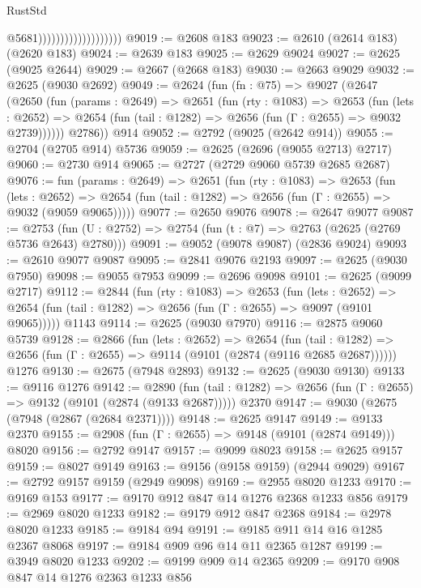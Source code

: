 \begin{lexlean}{RustStd}
\begin{coremodule}
                                          @5681)))))))))))))))))))
@9019 := @2608 @183
@9023 := @2610 (@2614 @183) (@2620 @183)
@9024 := @2639 @183
@9025 := @2629 @9024
@9027 := @2625 (@9025 @2644)
@9029 := @2667 (@2668 @183)
@9030 := @2663 @9029
@9032 := @2625 (@9030 @2692)
@9049 := @2624
    (fun (fn : @75) =>
    @9027
      (@2647
        (@2650
          (fun (params : @2649) =>
          @2651
            (fun (rty : @1083) =>
            @2653
              (fun (lets : @2652) =>
              @2654 (fun (tail : @1282) => @2656 (fun (Γ : @2655) => @9032 @2739))))))
        @2786))
    @914
@9052 := @2792 (@9025 (@2642 @914))
@9055 := @2704 (@2705 @914) @5736
@9059 := @2625 (@2696 (@9055 @2713) @2717)
@9060 := @2730 @914
@9065 := @2727 (@2729 @9060 @5739 @2685 @2687)
@9076 := fun (params : @2649) =>
  @2651
    (fun (rty : @1083) =>
    @2653
      (fun (lets : @2652) =>
      @2654 (fun (tail : @1282) => @2656 (fun (Γ : @2655) => @9032 (@9059 @9065)))))
@9077 := @2650 @9076
@9078 := @2647 @9077
@9087 := @2753 (fun (U : @2752) => @2754 (fun (t : @7) => @2763 (@2625 (@2769 @5736 @2643) @2780)))
@9091 := @9052 (@9078 @9087) (@2836 @9024)
@9093 := @2610 @9077 @9087
@9095 := @2841 @9076 @2193
@9097 := @2625 (@9030 @7950)
@9098 := @9055 @7953
@9099 := @2696 @9098
@9101 := @2625 (@9099 @2717)
@9112 := @2844
    (fun (rty : @1083) =>
    @2653
      (fun (lets : @2652) =>
      @2654 (fun (tail : @1282) => @2656 (fun (Γ : @2655) => @9097 (@9101 @9065)))))
    @1143
@9114 := @2625 (@9030 @7970)
@9116 := @2875 @9060 @5739
@9128 := @2866
    (fun (lets : @2652) =>
    @2654
      (fun (tail : @1282) => @2656 (fun (Γ : @2655) => @9114 (@9101 (@2874 (@9116 @2685 @2687))))))
    @1276
@9130 := @2675 (@7948 @2893)
@9132 := @2625 (@9030 @9130)
@9133 := @9116 @1276
@9142 := @2890
    (fun (tail : @1282) => @2656 (fun (Γ : @2655) => @9132 (@9101 (@2874 (@9133 @2687)))))
    @2370
@9147 := @9030 (@2675 (@7948 (@2867 (@2684 @2371))))
@9148 := @2625 @9147
@9149 := @9133 @2370
@9155 := @2908 (fun (Γ : @2655) => @9148 (@9101 (@2874 @9149))) @8020
@9156 := @2792 @9147
@9157 := @9099 @8023
@9158 := @2625 @9157
@9159 := @8027 @9149
@9163 := @9156 (@9158 @9159) (@2944 @9029)
@9167 := @2792 @9157 @9159 (@2949 @9098)
@9169 := @2955 @8020 @1233
@9170 := @9169 @153
@9177 := @9170 @912 @847 @14 @1276 @2368 @1233 @856
@9179 := @2969 @8020 @1233
@9182 := @9179 @912 @847 @2368
@9184 := @2978 @8020 @1233
@9185 := @9184 @94
@9191 := @9185 @911 @14 @16 @1285 @2367 @8068
@9197 := @9184 @909 @96 @14 @11 @2365 @1287
@9199 := @3949 @8020 @1233
@9202 := @9199 @909 @14 @2365
@9209 := @9170 @908 @847 @14 @1276 @2363 @1233 @856

\end{coremodule}
\end{lexlean}

